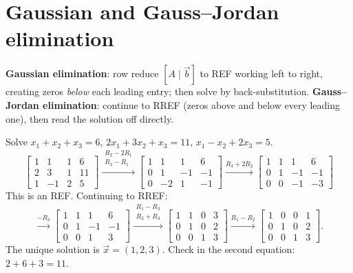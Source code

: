 \section{Gaussian and Gauss--Jordan elimination}

\begin{important}[Algorithm]
\textbf{Gaussian elimination}: row reduce $[A\mid\vec b]$ to REF working left to right, creating
zeros \emph{below} each leading entry; then solve by back-substitution.
\textbf{Gauss--Jordan elimination}: continue to RREF (zeros above and below every leading one),
then read the solution off directly.
\end{important}

\begin{example}
Solve $x_1+x_2+x_3=6$, $2x_1+3x_2+x_3=11$, $x_1-x_2+2x_3=5$.
\[
\left[\begin{array}{ccc|c} 1&1&1&6\\ 2&3&1&11\\ 1&-1&2&5\end{array}\right]
\xrightarrow{\substack{R_2-2R_1\\R_3-R_1}}
\left[\begin{array}{ccc|c} 1&1&1&6\\ 0&1&-1&-1\\ 0&-2&1&-1\end{array}\right]
\xrightarrow{R_3+2R_2}
\left[\begin{array}{ccc|c} 1&1&1&6\\ 0&1&-1&-1\\ 0&0&-1&-3\end{array}\right]
\]
This is an REF. Continuing to RREF:
\[
\xrightarrow{-R_3}
\left[\begin{array}{ccc|c} 1&1&1&6\\ 0&1&-1&-1\\ 0&0&1&3\end{array}\right]
\xrightarrow{\substack{R_1-R_3\\R_2+R_3}}
\left[\begin{array}{ccc|c} 1&1&0&3\\ 0&1&0&2\\ 0&0&1&3\end{array}\right]
\xrightarrow{R_1-R_2}
\left[\begin{array}{ccc|c} 1&0&0&1\\ 0&1&0&2\\ 0&0&1&3\end{array}\right].
\]
The unique solution is $\vec x=(1,2,3)$. Check in the second equation: $2+6+3=11$.
\end{example}

